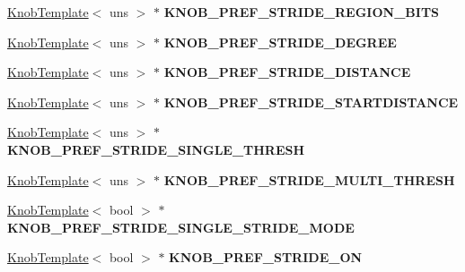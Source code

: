 \begin{DoxyCompactItemize}
\item 
\hypertarget{classall__knobs__c_ad44dd4bf778c1e6968804cfb3f516112}{
\hyperlink{classKnobTemplate}{KnobTemplate}$<$ uns $>$ $\ast$ {\bfseries KNOB\_\-PREF\_\-STRIDE\_\-REGION\_\-BITS}}
\label{classall__knobs__c_ad44dd4bf778c1e6968804cfb3f516112}

\item 
\hypertarget{classall__knobs__c_a03750b712fe6b3e1d8dbe206ae1885f6}{
\hyperlink{classKnobTemplate}{KnobTemplate}$<$ uns $>$ $\ast$ {\bfseries KNOB\_\-PREF\_\-STRIDE\_\-DEGREE}}
\label{classall__knobs__c_a03750b712fe6b3e1d8dbe206ae1885f6}

\item 
\hypertarget{classall__knobs__c_a9bf32cc25ad3cba3d66bc25bd38e18ef}{
\hyperlink{classKnobTemplate}{KnobTemplate}$<$ uns $>$ $\ast$ {\bfseries KNOB\_\-PREF\_\-STRIDE\_\-DISTANCE}}
\label{classall__knobs__c_a9bf32cc25ad3cba3d66bc25bd38e18ef}

\item 
\hypertarget{classall__knobs__c_ac2515710703d07ba44397000b475a9bc}{
\hyperlink{classKnobTemplate}{KnobTemplate}$<$ uns $>$ $\ast$ {\bfseries KNOB\_\-PREF\_\-STRIDE\_\-STARTDISTANCE}}
\label{classall__knobs__c_ac2515710703d07ba44397000b475a9bc}

\item 
\hypertarget{classall__knobs__c_af9d93cd54c2d028ef7889dfb6db193cc}{
\hyperlink{classKnobTemplate}{KnobTemplate}$<$ uns $>$ $\ast$ {\bfseries KNOB\_\-PREF\_\-STRIDE\_\-SINGLE\_\-THRESH}}
\label{classall__knobs__c_af9d93cd54c2d028ef7889dfb6db193cc}

\item 
\hypertarget{classall__knobs__c_af4b9c7d44dc5736ccaeadfc30ecf0cf8}{
\hyperlink{classKnobTemplate}{KnobTemplate}$<$ uns $>$ $\ast$ {\bfseries KNOB\_\-PREF\_\-STRIDE\_\-MULTI\_\-THRESH}}
\label{classall__knobs__c_af4b9c7d44dc5736ccaeadfc30ecf0cf8}

\item 
\hypertarget{classall__knobs__c_ae8683c353b62ddaa7abb8a56ba2ba8ff}{
\hyperlink{classKnobTemplate}{KnobTemplate}$<$ bool $>$ $\ast$ {\bfseries KNOB\_\-PREF\_\-STRIDE\_\-SINGLE\_\-STRIDE\_\-MODE}}
\label{classall__knobs__c_ae8683c353b62ddaa7abb8a56ba2ba8ff}

\item 
\hypertarget{classall__knobs__c_aa232c5102ee3d1aae9f521b07747708a}{
\hyperlink{classKnobTemplate}{KnobTemplate}$<$ bool $>$ $\ast$ {\bfseries KNOB\_\-PREF\_\-STRIDE\_\-ON}}
\label{classall__knobs__c_aa232c5102ee3d1aae9f521b07747708a}


\end{DoxyCompactItemize}
